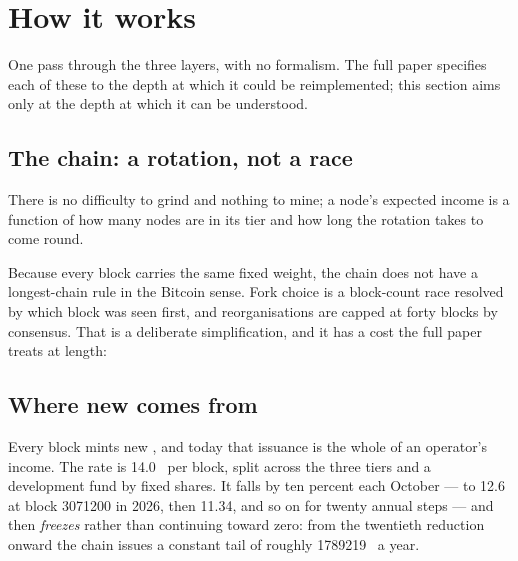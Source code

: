 \section{How it works}
\label{sec:short:how}

One pass through the three layers, with no formalism. The full paper specifies each of these to the
depth at which it could be reimplemented; this section aims only at the depth at which it can be
understood.

\subsection{The chain: a rotation, not a race}

 There is no difficulty to grind and nothing to mine; a node's expected income is a function
of how many nodes are in its tier and how long the rotation takes to come round.

Because every block carries the same fixed weight, the chain does not have a longest-chain rule in
the Bitcoin sense. Fork choice is a block-count race resolved by which block was seen first, and
reorganisations are capped at forty blocks by consensus. That is a deliberate simplification, and it
has a cost the full paper treats at length: 

\subsection{Where new \flux{} comes from}

Every block mints new \flux{}, and today that issuance is the whole of an operator's income. The
rate is \num{14.0}~\flux{} per block, split across the three tiers and a development fund by fixed
shares. It falls by ten percent each October --- to \num{12.6} at block \num{3071200} in 2026, then
\num{11.34}, and so on for twenty annual steps --- and then \emph{freezes} rather than continuing
toward zero: from the twentieth reduction onward the chain issues a constant tail of roughly
\num{1789219}~\flux{} a year. 

